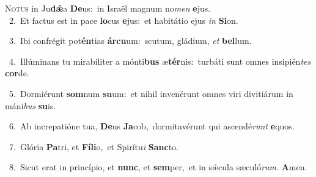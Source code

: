 \lettrine{\initial\textcolor{\initialcolor}{N}}{otus} in Ju\-\textbf{dǽ}\-a \textbf{De}\-us:~\star in Israël magnum no\textit{men} \textbf{e}\-jus.\\
{\numbfont\textcolor{\numbcolor}{~2.}}~Et factus est in pace \textbf{lo}\-cus \textbf{e}\-jus:~\star et habitátio ejus \textit{in} \textbf{Si}\-on.\par
{\numbfont\textcolor{\numbcolor}{~3.}}~Ibi confrégit pot\-\textbf{én}\-tias \textbf{ár}\-\textbf{cu}um:~\star scutum, gládium, \textit{et} \textbf{bel}\-lum.\par
{\numbfont\textcolor{\numbcolor}{~4.}}~Illúminans tu mirabíliter a mónti\textbf{bus} æ\-\textbf{tér}\-nis:~\star turbáti sunt omnes insipién\textit{tes} \textbf{cor}\-de.\par
{\numbfont\textcolor{\numbcolor}{~5.}}~Dormiérunt \textbf{som}\-num \textbf{su}\-um:~\star et nihil invenérunt omnes viri divitiárum in máni\textit{bus} \textbf{su}\-is.\par
{\numbfont\textcolor{\numbcolor}{~6.}}~Ab increpatióne tua, \textbf{De}\-us \textbf{Ja}\-cob,~\star dormitavérunt qui ascendé\textit{runt} \textbf{e}\-quos.\par
{\numbfont\textcolor{\numbcolor}{~7.}}~Glória \textbf{Pa}\-tri, et \textbf{Fí}\-\textbf{li}o,~\star et Spirítu\textit{i} \textbf{Sanc}\-to.\par
{\numbfont\textcolor{\numbcolor}{~8.}}~Sicut erat in princípio, et \textbf{nunc}\-, et \textbf{sem}\-per,~\star et in sǽcula sæculó\-\textit{rum}\-. \textbf{A}\-men.\par
